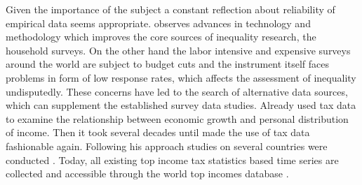 \documentclass[twoside]{article}\usepackage[]{graphicx}\usepackage[]{color}
\begin{document}
\begin{multicols}{2}
Given the importance of the subject a constant reflection about reliability of empirical data seems appropriate. \citet[8]{Atkinson 2013:8 FEHLT} observes advances in technology and methodology which improves the core sources of inequality research, the household surveys.  On the other hand the labor intensive and expensive surveys around the world are subject to budget cuts and the instrument itself faces problems in form of low response rates, which affects the assessment of inequality undisputedly. These concerns have led to the search of alternative data sources, which can supplement the established survey data studies. Already \citet{kuznets_economic_1955} used tax data to examine the relationship between economic growth and personal distribution of income. Then it took several decades until \citet{piketty_les_2001, piketty_income_2003,piketty_income_2003-1} made the use of tax data fashionable again. Following his approach studies on several countries were conducted \citep{atkinson_top_2007,atkinson_top_2010}. Today, all existing top income tax statistics based time series are collected and accessible through the world top incomes database \citep{Alvaredo et al. 2014 FEHLT}. \\


\end{multicols}
\end{document}
